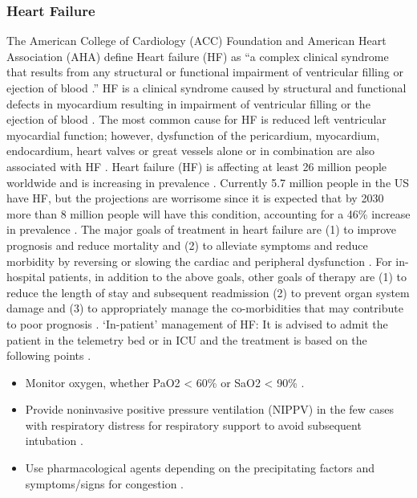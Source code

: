 \subsubsection{Heart Failure} %
The American College of Cardiology (ACC) Foundation and American Heart Association (AHA) define Heart failure (HF) as “a complex clinical syndrome that results from any structural or functional impairment of ventricular filling or ejection of blood \cite{ziaeian_epidemiology_2016}.” HF is a clinical syndrome caused by structural and functional defects in myocardium resulting in impairment of ventricular filling or the ejection of blood \cite{inamdar_heart_2016}. The most common cause for HF is reduced left ventricular myocardial function; however, dysfunction of the pericardium, myocardium, endocardium, heart valves or great vessels alone or in combination are also associated with HF \cite{inamdar_heart_2016}.
Heart failure (HF) is affecting at least 26 million people worldwide and is increasing in prevalence \cite{savarese_global_2017}. Currently 5.7 million people in the US have HF, but the projections are worrisome since it is expected that by 2030 more than 8 million people will have this condition, accounting for a 46\% increase in prevalence \cite{savarese_global_2017}.
The major goals of treatment in heart failure are (1) to improve prognosis and reduce mortality and (2) to alleviate symptoms and reduce morbidity by reversing or slowing the cardiac and peripheral dysfunction \cite{inamdar_heart_2016}. For in-hospital patients, in addition to the above goals, other goals of therapy are (1) to reduce the length of stay and subsequent readmission (2) to prevent organ system damage and (3) to appropriately manage the co-morbidities that may contribute to poor prognosis \cite{inamdar_heart_2016}.
‘In-patient’ management of HF: It is advised to admit the patient in the telemetry bed or in ICU and the treatment is based on the following points \cite{inamdar_heart_2016}.
\begin{itemize}
    \item Monitor oxygen, whether PaO2 < 60\% or SaO2 < 90\% \cite{inamdar_heart_2016}.
    \item Provide noninvasive positive pressure ventilation (NIPPV) in the few cases with respiratory distress for respiratory support to avoid subsequent intubation \cite{inamdar_heart_2016}.
    \item Use pharmacological agents depending on the precipitating factors and symptoms/signs for congestion \cite{inamdar_heart_2016}.
\end{itemize}

